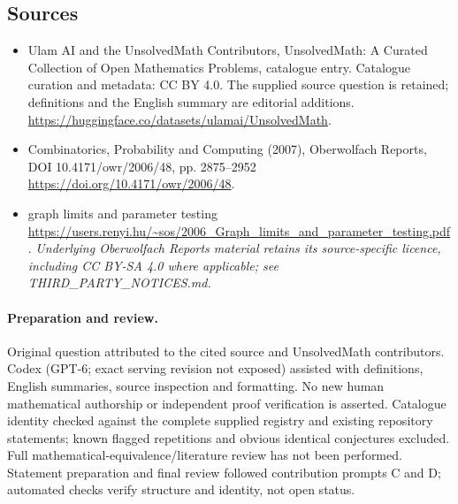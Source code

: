 \documentclass[11pt]{article}
\begin{document}
\subsection{Sources}
\begin{itemize}
\item[\hypertarget{source:statement:1}{S1}] Ulam AI and the UnsolvedMath Contributors, UnsolvedMath: A Curated Collection of Open Mathematics Problems, catalogue entry. Catalogue curation and metadata: CC BY 4.0. The supplied source question is retained; definitions and the English summary are editorial additions.
\url{https://huggingface.co/datasets/ulamai/UnsolvedMath}.
\item[\hypertarget{source:statement:2}{S2}] Combinatorics, Probability and Computing (2007), Oberwolfach Reports, DOI 10.4171/owr/2006/48, pp. 2875--2952
\url{https://doi.org/10.4171/owr/2006/48}.
\item[\hypertarget{source:statement:3}{S3}] graph limits and parameter testing
\url{https://users.renyi.hu/~sos/2006_Graph_limits_and_parameter_testing.pdf}.
\textit{Underlying Oberwolfach Reports material retains its source-specific licence, including CC BY-SA 4.0 where applicable; see THIRD\_PARTY\_NOTICES.md.}
\end{itemize}
\paragraph{Preparation and review.}
Original question attributed to the cited source and UnsolvedMath contributors. Codex (GPT-6; exact serving revision not exposed) assisted with definitions, English summaries, source inspection and formatting. No new human mathematical authorship or independent proof verification is asserted. Catalogue identity checked against the complete supplied registry and existing repository statements; known flagged repetitions and obvious identical conjectures excluded. Full mathematical-equivalence/literature review has not been performed. Statement preparation and final review followed contribution prompts C and D; automated checks verify structure and identity, not open status.
\label{end:statement}
\end{document}
